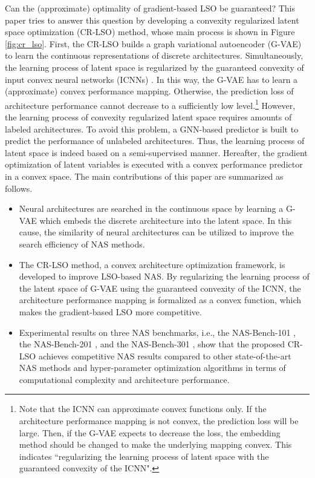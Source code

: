 \documentclass[10pt,twocolumn,letterpaper]{article}
\begin{document}
Can the (approximate) optimality of gradient-based LSO be guaranteed? This paper tries to answer this question by developing a convexity regularized latent space optimization (CR-LSO) method, whose main process is shown in Figure \ref{fig:cr_lso}. First, the CR-LSO builds a graph variational autoencoder (G-VAE) to learn the continuous representations of discrete architectures. Simultaneously, the learning process of latent space is regularized by the guaranteed convexity of input convex neural networks (ICNNs) \cite{amos2017input}. In this way, the G-VAE has to learn a (approximate) convex performance mapping. Otherwise, the prediction loss of architecture performance cannot decrease to a sufficiently low level.\footnote{Note that the ICNN can approximate convex functions only. If the architecture performance mapping is not convex, the prediction loss will be large. Then, if the G-VAE expects to decrease the loss, the embedding method should be changed to make the underlying mapping convex. This indicates ``regularizing the learning process of latent space with the guaranteed convexity of the ICNN".} However, the learning process of convexity regularized latent space requires amounts of labeled architectures. To avoid this problem, a GNN-based predictor is built to predict the performance of unlabeled architectures. Thus, the learning process of latent space is indeed based on a semi-supervised manner. Hereafter, the gradient optimization of latent variables is executed with a convex performance predictor in a convex space. The main contributions of this paper are summarized as follows.
\begin{itemize}
	\item Neural architectures are searched in the continuous space by learning a G-VAE which embeds the discrete architecture into the latent space. In this cause, the similarity of neural architectures can be utilized to improve the search efficiency of NAS methods.
	\item The CR-LSO method, a convex architecture optimization framework, is developed to improve LSO-based NAS. By regularizing the learning process of the latent space of G-VAE using the guaranteed convexity of the ICNN, the architecture performance mapping is formalized as a convex function, which makes the gradient-based LSO more competitive.
	\item Experimental results on three NAS benchmarks, i.e., the NAS-Bench-101 \cite{DBLP:conf/icml/YingKCR0H19}, the NAS-Bench-201 \cite{DBLP:conf/iclr/Dong020}, and the NAS-Bench-301 \cite{siems2020bench}, show that the proposed CR-LSO achieves competitive NAS results compared to other state-of-the-art NAS methods and hyper-parameter optimization algorithms in terms of computational complexity and architecture performance.
\end{itemize}
\end{document}
